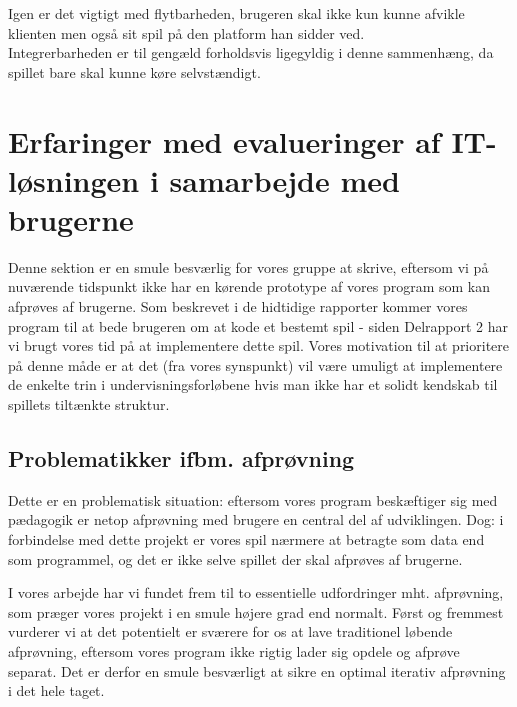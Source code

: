 \documentclass[10pt,a4paper,danish]{article}
\begin{document}
Igen er det vigtigt med flytbarheden, brugeren skal ikke kun kunne afvikle klienten men også sit spil på den platform han sidder ved.
\\

Integrerbarheden er til gengæld forholdsvis ligegyldig i denne sammenhæng, da spillet bare skal kunne køre selvstændigt.



\section{Erfaringer med evalueringer af IT-løsningen i samarbejde med brugerne}
Denne sektion er en smule besværlig for vores gruppe at skrive, eftersom vi på nuværende
tidspunkt ikke har en kørende prototype af vores program som kan afprøves af brugerne. 
Som beskrevet i de hidtidige rapporter kommer vores program til at bede brugeren om at kode
et bestemt spil - siden Delrapport 2 har vi brugt vores tid på at implementere dette spil.
Vores motivation til at prioritere på denne måde er at det (fra vores synspunkt) vil være
umuligt at implementere de enkelte trin i undervisningsforløbene hvis man ikke har et 
solidt kendskab til spillets tiltænkte struktur.  

\subsection{Problematikker ifbm. afprøvning}
Dette er en problematisk situation: eftersom vores program beskæftiger sig med pædagogik
er netop afprøvning med brugere en central del af udviklingen. Dog: i forbindelse med dette 
projekt er vores spil nærmere at betragte som data end som 
programmel, og det er ikke selve spillet der skal afprøves af brugerne.

I vores arbejde har vi fundet frem til to essentielle udfordringer mht. afprøvning, som præger 
vores projekt i en smule højere grad end normalt. Først og fremmest vurderer vi at det potentielt 
er sværere for os at lave traditionel løbende afprøvning, eftersom vores 
program ikke rigtig lader sig opdele og afprøve separat. Det er derfor en smule besværligt at 
sikre en optimal iterativ afprøvning i det hele taget. 
\end{document}
